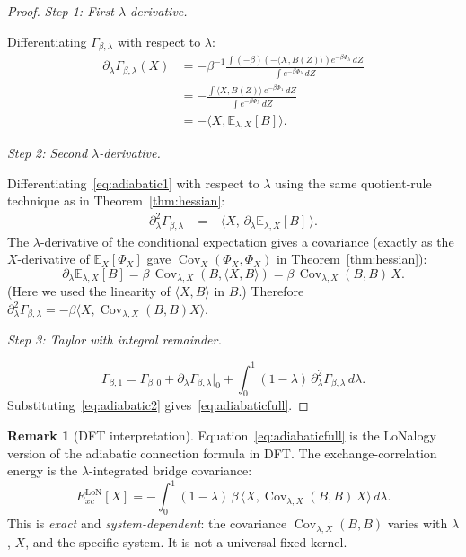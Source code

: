 \documentclass[12pt]{article}
\theoremstyle{plain}
\theoremstyle{definition}
\newtheorem{remark}[theorem]{Remark}
\numberwithin{equation}{section}
\newcommand{\LoN}{\mathrm{LoN}}
\DeclareMathOperator{\Cov}{Cov}
\begin{document}
\begin{proof}
\emph{Step 1: First $\lambda$-derivative.}

Differentiating $\Gamma_{\beta,\lambda}$ with respect to $\lambda$:
\begin{align}
\partial_\lambda\Gamma_{\beta,\lambda}(X)
&= -\beta^{-1}\frac{\int(-\beta)(-\langle X,B(Z)\rangle)
e^{-\beta\Phi_\lambda}\,dZ}
{\int e^{-\beta\Phi_\lambda}\,dZ}\\
&= -\frac{\int\langle X,B(Z)\rangle\,e^{-\beta\Phi_\lambda}\,dZ}
{\int e^{-\beta\Phi_\lambda}\,dZ}\\
&= -\langle X,\mathbb{E}_{\lambda,X}[B]\rangle.
\end{align}

\emph{Step 2: Second $\lambda$-derivative.}

Differentiating~\eqref{eq:adiabatic1} with respect to $\lambda$
using the same quotient-rule technique as in
Theorem~\ref{thm:hessian}:
\begin{align}
\partial_\lambda^2\Gamma_{\beta,\lambda}
&= -\langle X,\,\partial_\lambda\mathbb{E}_{\lambda,X}[B]\,\rangle.
\end{align}
The $\lambda$-derivative of the conditional expectation gives a
covariance (exactly as the $X$-derivative of $\mathbb{E}_X[\Phi_X]$
gave $\Cov_X(\Phi_X,\Phi_X)$ in Theorem~\ref{thm:hessian}):
\begin{equation}
\partial_\lambda\mathbb{E}_{\lambda,X}[B]
= \beta\,\Cov_{\lambda,X}(B,\langle X,B\rangle)
= \beta\,\Cov_{\lambda,X}(B,B)\,X.
\end{equation}
(Here we used the linearity of $\langle X,B\rangle$ in $B$.)
Therefore
$\partial_\lambda^2\Gamma_{\beta,\lambda}
=-\beta\langle X,\Cov_{\lambda,X}(B,B)X\rangle$.

\emph{Step 3: Taylor with integral remainder.}

\begin{equation}
\Gamma_{\beta,1}
= \Gamma_{\beta,0}
+ \partial_\lambda\Gamma_{\beta,\lambda}\big|_0
+ \int_0^1(1-\lambda)\,\partial_\lambda^2\Gamma_{\beta,\lambda}\,d\lambda.
\end{equation}
Substituting~\eqref{eq:adiabatic2}
gives~\eqref{eq:adiabaticfull}.
\end{proof}

\begin{remark}[DFT interpretation]
Equation~\eqref{eq:adiabaticfull} is the LoNalogy version of the
adiabatic connection formula in DFT.  The exchange-correlation
energy is the $\lambda$-integrated bridge covariance:
\begin{equation}
E_{xc}^{\LoN}[X] = -\int_0^1(1-\lambda)\,\beta\,
\langle X,\Cov_{\lambda,X}(B,B)\,X\rangle\,d\lambda.
\end{equation}
This is \emph{exact} and \emph{system-dependent}: the covariance
$\Cov_{\lambda,X}(B,B)$ varies with $\lambda$, $X$, and the
specific system.  It is not a universal fixed kernel.
\end{remark}
\end{document}
